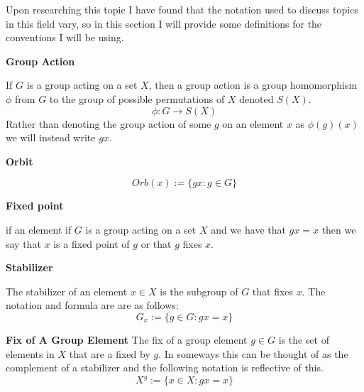 \documentclass[../main.tex]{subfiles}
\begin{document}
    Upon researching this topic I have found that the notation used to discuss topics in this field vary, so in this section I will provide some definitions for the conventions I will be using.
    
    \textbf{Group Action}
    
    If $G$ is a group acting on a set $X$, then a group action is a group homomorphism $\phi$ from $G$ to the group of possible permutations of $X$ denoted $S(X)$.
    \begin{equation*}
    \phi: G \rightarrow S(X)
    \end{equation*}
    Rather than denoting the group action of some $g$ on an element $x$ as $\phi(g)(x)$ we will instead write $gx$.

    \textbf{Orbit}

    \begin{equation*}
    Orb(x) := \{gx:g \in G\}
    \end{equation*}

    \textbf{Fixed point}
    
    if an element if $G$ is a group acting on a set $X$ and we have that $gx = x$ then we say that $x$ is a fixed point of $g$ or that $g$ fixes $x$.

    \textbf{Stabilizer}
    
    The stabilizer of an element $x \in X$ is the subgroup of $G$ that fixes $x$. The notation and formula are are as follows:
    \begin{equation*}
    G_x := \{g \in G: gx = x\}
    \end{equation*}
    
    \textbf{Fix of A Group Element}
    The fix of a group element $g \in G$ is the set of elements in $X$ that are a fixed by $g$. In someways this can be thought of as the complement of a stabilizer and the following notation is reflective of this.
    \begin{equation*}
    X^g := \{x \in X: gx = x\}
    \end{equation*}
    
    
    
\end{document}
